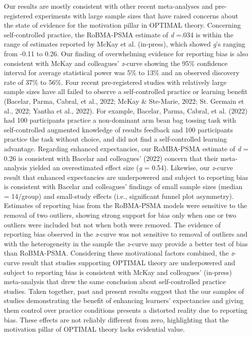 \documentclass[
  man, donotrepeattitle,floatsintext]{apa7}
\begin{document}
Our results are mostly consistent with other recent meta-analyses and pre-registered experiments with large sample sizes that have raised concerns about the state of evidence for the motivation pillar in OPTIMAL theory. Concerning self-controlled practice, the RoBMA-PSMA estimate of \emph{d} =.034 is within the range of estimates reported by McKay et al. (in-press), which showed \emph{g}'s ranging from -0.11 to 0.26. Our finding of overwhelming evidence for reporting bias is also consistent with McKay and colleagues' \emph{z}-curve showing the 95\% confidence interval for average statistical power was 5\% to 13\% and an observed discovery rate of 37\% to 56\%. Four recent pre-registered studies with relatively large sample sizes have all failed to observe a self-controlled practice or learning benefit (Bacelar, Parma, Cabral, et al., 2022; McKay \& Ste-Marie, 2022; St. Germain et al., 2022; Yantha et al., 2022). For example, Bacelar, Parma, Cabral, et al. (2022) had 100 participants practice a non-dominant arm bean bag tossing task with self-controlled augmented knowledge of results feedback and 100 participants practice the task without choice, and did not find a self-controlled learning advantage. Regarding enhanced expectancies, our RoMBA-PSMA estimate of \emph{d} = 0.26 is consistent with Bacelar and colleagues' (2022) concern that their meta-analysis yielded an overestimated effect size (\emph{g} = 0.54). Likewise, our \emph{z}-curve result that enhanced expectancies are underpowered and subject to reporting bias is consistent with Bacelar and colleagues' findings of small sample sizes (median = 14/group) and small-study effects (i.e., significant funnel plot asymmetry). Estimates of reporting bias from the RoBMA-PSMA models were sensitive to the removal of two outliers, showing strong support for bias only when one or two outliers were included but not when both were removed. The evidence of reporting bias observed in the \emph{z}-curve was not sensitive to removal of outliers and with the heterogeneity in the sample the \emph{z}-curve may provide a better test of bias than RoBMA-PSMA. Considering these motivational factors combined, the \emph{z}-curve result that studies supporting OPTIMAL theory are underpowered and subject to reporting bias is consistent with McKay and colleagues' (in-press) meta-analysis that drew the same conclusion about self-controlled practice studies. Taken together, past and present results suggest that the our samples of studies demonstrating the benefit of enhancing learners' expectancies and giving them control over practice conditions presents a distorted reality due to reporting bias. These effects are not reliably different from zero, highlighting that the motivation pillar of OPTIMAL theory lacks evidential value.
\end{document}
